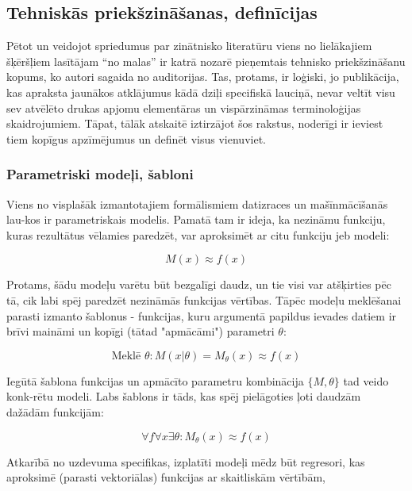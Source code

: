 \documentclass[12pt, a4paper]{article}
\numberwithin{equation}{section} %
\begin{document}
\subsection{Tehniskās priekšzināšanas, definīcijas}

Pētot un veidojot spriedumus par zinātnisko literatūru viens no lielākajiem šķēršļiem lasītājam ``no malas'' ir katrā nozarē pieņemtais tehnisko priekšzināšanu kopums, ko autori sagaida no auditorijas. Tas, protams, ir loģiski, jo publikācija, kas apraksta jaunākos atklājumus kādā dziļi specifiskā lauciņā, nevar veltīt visu sev atvēlēto drukas apjomu elementāras un vispārzināmas terminoloģijas skaidrojumiem. Tāpat, tālāk atskaitē iztirzājot šos rakstus, noderīgi ir ieviest tiem kopīgus apzīmējumus un definēt visus vienuviet.

\subsubsection{Parametriski modeļi, šabloni}

Viens no visplašāk izmantotajiem formālismiem datizraces un mašīnmācīšanās lau-kos ir parametriskais modelis. Pamatā tam ir ideja, ka nezināmu funkciju, kuras rezultātus vēlamies paredzēt, var aproksimēt ar citu funkciju jeb modeli:

\begin{equation} 
    M(x) \approx f(x)
\end{equation}

Protams, šādu modeļu varētu būt bezgalīgi daudz, un tie visi var atšķirties pēc tā, cik labi spēj paredzēt nezināmās funkcijas vērtības. Tāpēc modeļu meklēšanai parasti izmanto šablonus - funkcijas, kuru argumentā papildus ievades datiem ir brīvi maināmi un kopīgi (tātad "apmācāmi") parametri $\theta$:

\begin{equation} 
    \text{Meklē } \theta:M(x \vert \theta) = M_{\theta}(x)  \approx f(x)
\end{equation}

Iegūtā šablona funkcijas un apmācīto parametru kombinācija $\lbrace M, \theta \rbrace$ tad veido konk-rētu modeli. Labs šablons ir tāds, kas spēj pielāgoties ļoti daudzām dažādām funkcijām:

\begin{equation} 
    \forall f \forall x \exists \theta:M_{\theta}(x)\approx f(x)
\end{equation}

Atkarībā no uzdevuma specifikas, izplatīti modeļi mēdz būt regresori, kas aproksimē (parasti vektoriālas) funkcijas ar skaitliskām vērtībām,
\end{document}
